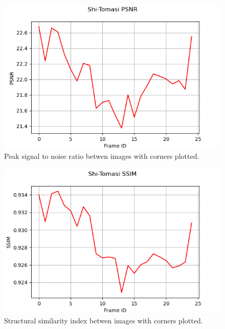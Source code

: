 \documentclass[11pt, conference, letterpaper]{IEEEtran}
\begin{document}
\begin{figure}[t]
    \centering
    \includegraphics[width=\linewidth]{images/stc_psnr.png}
    \caption{Peak signal to noise ratio betwen images with corners plotted.}
    \label{fig:stc-psnr}
\end{figure}

\begin{figure}[t]
    \centering
    \includegraphics[width=\linewidth]{images/stc_ssim.png}
    \caption{Structural similarity index betwen images with corners plotted.}
    \label{fig:stc-ssim}
\end{figure}
\end{document}
